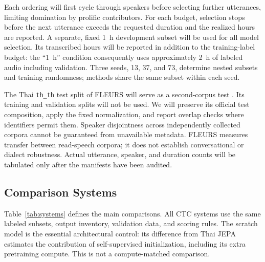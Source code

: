 Each ordering will first cycle through speakers before selecting further utterances, limiting domination by prolific contributors. For each budget, selection stops before the next utterance exceeds the requested duration and the realized hours are reported. A separate, fixed 1~h development subset will be used for all model selection. Its transcribed hours will be reported in addition to the training-label budget: the ``1~h'' condition consequently uses approximately 2~h of labeled audio including validation. Three seeds, 13, 37, and 73, determine nested subsets and training randomness; methods share the same subset within each seed.

The Thai \texttt{th\_th} test split of FLEURS will serve as a second-corpus test \cite{conneau2022fleurs}. Its training and validation splits will not be used. We will preserve its official test composition, apply the fixed normalization, and report overlap checks where identifiers permit them. Speaker disjointness across independently collected corpora cannot be guaranteed from unavailable metadata. FLEURS measures transfer between read-speech corpora; it does not establish conversational or dialect robustness. Actual utterance, speaker, and duration counts will be tabulated only after the manifests have been audited.

\subsection{Comparison Systems}
Table~\ref{tab:systems} defines the main comparisons. All CTC systems use the same labeled subsets, output inventory, validation data, and scoring rules. The scratch model is the essential architectural control: its difference from Thai JEPA estimates the contribution of self-supervised initialization, including its extra pretraining compute. This is not a compute-matched comparison.

